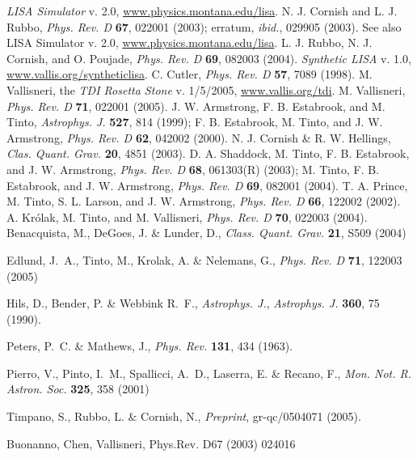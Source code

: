 %
 \emph{LISA Simulator} v. 2.0, \url{www.physics.montana.edu/lisa}.
%
 N. J. Cornish and L. J. Rubbo, \emph{Phys. Rev. D} \textbf{67}, 022001 (2003); erratum, \emph{ibid.}, 029905 (2003). See also LISA Simulator v. 2.0, \url{www.physics.montana.edu/lisa}.
%
 L. J. Rubbo, N. J. Cornish, and O. Poujade, \emph{Phys. Rev. D} \textbf{69}, 082003 (2004). 
%
 \emph{Synthetic LISA} v. 1.0, \url{www.vallis.org/syntheticlisa}.
%
 C. Cutler, \emph{Phys. Rev. D} \textbf{57}, 7089 (1998).
%
 M. Vallisneri, the \emph{TDI Rosetta Stone} v. 1/5/2005, \url{www.vallis.org/tdi}.
%
 M. Vallisneri, \emph{Phys. Rev. D} \textbf{71}, 022001 (2005).
%
 J. W. Armstrong, F. B. Estabrook, and M. Tinto,
\emph{Astrophys. J.} \textbf{527}, 814 (1999); F. B. Estabrook, M. Tinto, and J. W. Armstrong, \emph{Phys. Rev. D} \textbf{62}, 042002 (2000).
%
 N. J. Cornish \& R. W. Hellings, \emph{Clas. Quant. Grav.} \textbf{20}, 4851 (2003).
%
 D. A. Shaddock, M. Tinto, F. B. Estabrook, and J. W. Armstrong, \emph{Phys. Rev. D} \textbf{68}, 061303(R) (2003); M. Tinto, F. B. Estabrook, and J. W. Armstrong, \emph{Phys. Rev. D} \textbf{69}, 082001 (2004).
%
 T. A. Prince, M. Tinto, S. L. Larson, and J. W. Armstrong, \emph{Phys. Rev. D} \textbf{66}, 122002 (2002).
%
 A. Kr\'olak, M. Tinto, and M. Vallisneri, \emph{Phys. Rev. D} \textbf{70}, 022003 (2004).
%
%
Benacquista, M., DeGoes, J. \& Lunder, D., {\it Class. Quant. Grav.} {\bf 21}, S509 (2004)

Edlund, J.~A., Tinto, M., Krolak, A. \& Nelemans, G., {\it Phys. Rev. D} {\bf 71}, 122003 (2005)

Hils, D., Bender, P. \& Webbink R.~F., {\it Astrophys. J.}, {\it Astrophys. J.} {\bf 360}, 75 (1990).

Peters, P.~C. \& Mathews, J., {\it Phys. Rev.} {\bf 131}, 434 (1963).

Pierro, V., Pinto, I.~M., Spallicci, A.~D., Laserra, E. \& Recano, F., {\it Mon. Not. R. Astron. Soc.} {\bf 325}, 358 (2001)

Timpano, S., Rubbo, L. \& Cornish, N., {\it Preprint}, gr-qc/0504071 (2005).



 Buonanno, Chen, Vallisneri, Phys.Rev. D67 (2003) 
024016

